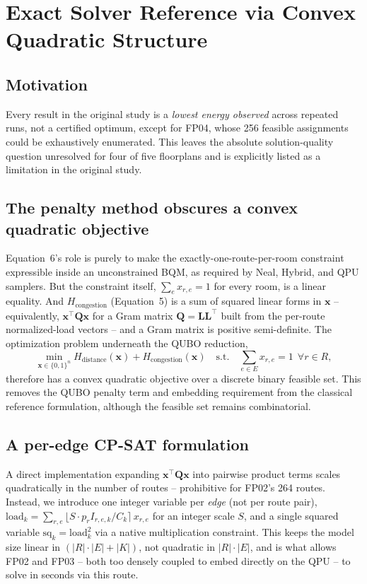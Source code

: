 \documentclass[11pt]{article}
\begin{document}
\section{Exact Solver Reference via Convex Quadratic Structure}
\label{sec:milp}

\subsection{Motivation}
Every result in the original study is a \emph{lowest energy observed} across repeated runs, not a certified optimum, except for FP04, whose 256 feasible assignments could be exhaustively enumerated. This leaves the absolute solution-quality question unresolved for four of five floorplans and is explicitly listed as a limitation in the original study.

\subsection{The penalty method obscures a convex quadratic objective}
Equation~6's role is purely to make the exactly-one-route-per-room constraint expressible inside an unconstrained BQM, as required by Neal, Hybrid, and QPU samplers. But the constraint itself, $\sum_{e} x_{r,e} = 1$ for every room, is a linear equality. And $H_{\text{congestion}}$ (Equation~5) is a sum of squared linear forms in $\mathbf{x}$ -- equivalently, $\mathbf{x}^\top \mathbf{Q} \mathbf{x}$ for a Gram matrix $\mathbf{Q} = \mathbf{L}\mathbf{L}^\top$ built from the per-route normalized-load vectors -- and a Gram matrix is positive semi-definite. The optimization problem underneath the QUBO reduction,
\begin{equation}
\min_{\mathbf{x} \in \{0,1\}^n} H_{\text{distance}}(\mathbf{x}) + H_{\text{congestion}}(\mathbf{x}) \quad \text{s.t.} \quad \sum_{e \in E} x_{r,e} = 1 \ \ \forall r \in R, \tag{8}
\end{equation}
therefore has a convex quadratic objective over a discrete binary feasible set. This removes the QUBO penalty term and embedding requirement from the classical reference formulation, although the feasible set remains combinatorial.

\subsection{A per-edge CP-SAT formulation}
A direct implementation expanding $\mathbf{x}^\top\mathbf{Q}\mathbf{x}$ into pairwise product terms scales quadratically in the number of routes -- prohibitive for FP02's 264 routes. Instead, we introduce one integer variable per \emph{edge} (not per route pair), $\text{load}_k = \sum_{r,e} \lfloor S \cdot p_r I_{r,e,k} / C_k \rceil\, x_{r,e}$ for an integer scale $S$, and a single squared variable $\text{sq}_k = \text{load}_k^2$ via a native multiplication constraint. This keeps the model size linear in $(|R|\!\cdot\!|E| + |K|)$, not quadratic in $|R|\!\cdot\!|E|$, and is what allows FP02 and FP03 -- both too densely coupled to embed directly on the QPU -- to solve in seconds via this route.
\end{document}
